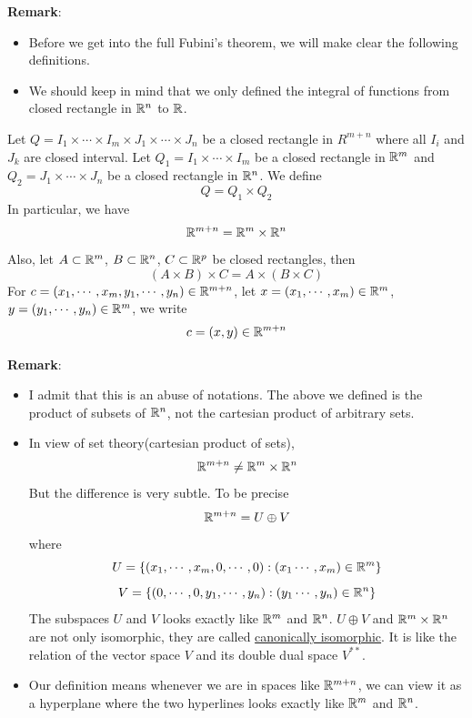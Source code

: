 \noindent \textbf{Remark}:
\begin{itemize}
    \item Before we get into the full Fubini's theorem, we will make clear the following definitions.
    \item We should keep in mind that we only defined the integral of functions from closed rectangle in $\mathbb{R}^n$ to $\mathbb{R}$.
\end{itemize}

\begin{definition}
    Let $Q=I_1\times\cdots\times I_m\times J_1\times\cdots \times J_n$ be a closed rectangle in $R^{m+n}$ where all $I_i$ and $J_k$ are closed interval. Let $Q_1=I_1\times \cdots \times I_m$ be a closed rectangle in $\mathbb{R}^m$ and $Q_2=J_1\times\cdots\times J_n$ be a closed rectangle in $\mathbb{R}^n$.
    We define
    $$Q=Q_1\times Q_2$$
    In particular, we have $$\mathbb{R}^{m+n}=\mathbb{R}^m\times \mathbb{R}^n$$
    Also, let $A\subset \mathbb{R}^m$, $B\subset\mathbb{R}^n$, $C\subset \mathbb{R}^p$ be closed rectangles, then $$(A\times B)\times C=A\times (B\times C)$$
    For $c=(x_1,\cdots,x_m,y_1,\cdots,y_n)\in \mathbb{R}^{m+n}$, let $x=(x_1,\cdots,x_m)\in \mathbb{R}^m$, $y=(y_1,\cdots,y_n)\in \mathbb{R}^m$, we write $$c=(x,y)\in \mathbb{R}^{m+n}$$
\end{definition}

\noindent \textbf{Remark}:
\begin{itemize}
    \item I admit that this is an abuse of notations. The above we defined is the product of subsets of $\mathbb{R}^n$, not the cartesian product of arbitrary sets.
    \item In view of set theory(cartesian product of sets), $$\mathbb{R}^{m+n}\neq\mathbb{R}^m\times\mathbb{R}^n$$
    But the difference is very subtle. To be precise $$\mathbb{R}^{m+n}=U\oplus V$$
    where $$U=\{(x_1,\cdots,x_m,0,\cdots,0):(x_1\cdots,x_m)\in \mathbb{R}^m\}$$
    $$V=\{(0,\cdots,0,y_1,\cdots,y_n):(y_1\cdots,y_n)\in \mathbb{R}^n\}$$
    The subspaces $U$ and $V$ looks exactly like $\mathbb{R}^m$ and $\mathbb{R}^n$. $U\oplus V$ and $\mathbb{R}^m\times \mathbb{R}^n$ are not only isomorphic, they are called \underline{canonically isomorphic}. It is like the relation of the vector space $V$ and its double dual space $V^{**}$.
    \item Our definition means whenever we are in spaces like $\mathbb{R}^{m+n}$, we can view it as a hyperplane where the two hyperlines looks exactly like $\mathbb{R}^m$ and $\mathbb{R}^n$.
\end{itemize}

